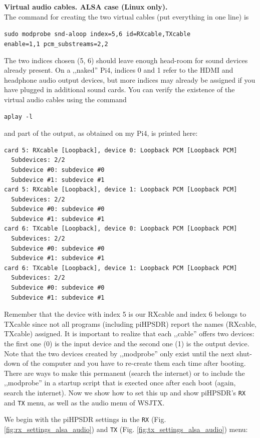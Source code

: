 \documentclass[12pt]{book}
\def\bltt#1{\texttt{\color{blue}#1}}
\begin{document}
\textbf{\color{red}Virtual audio cables. ALSA case (Linux only).} \\
The command for creating the two virtual cables (put everything in one line) is

\texttt{sudo modprobe snd-aloop index=5,6 id=RXcable,TXcable\\
enable=1,1 pcm\_substreams=2,2}

The two indices chosen (5, 6) should leave enough head-room for sound devices
already present. On a ,,naked'' Pi4, indices 0 and 1 refer to the HDMI
and headphone audio output devices, but more indices may already be assigned
if you have plugged in additional sound cards. You can verify the existence of
the virtual audio cables using the command

\texttt{aplay -l}

and part of the output, as obtained on my Pi4, is printed here:

\begin{small}
\begin{verbatim}
card 5: RXcable [Loopback], device 0: Loopback PCM [Loopback PCM]
  Subdevices: 2/2
  Subdevice #0: subdevice #0
  Subdevice #1: subdevice #1
card 5: RXcable [Loopback], device 1: Loopback PCM [Loopback PCM]
  Subdevices: 2/2
  Subdevice #0: subdevice #0
  Subdevice #1: subdevice #1
card 6: TXcable [Loopback], device 0: Loopback PCM [Loopback PCM]
  Subdevices: 2/2
  Subdevice #0: subdevice #0
  Subdevice #1: subdevice #1
card 6: TXcable [Loopback], device 1: Loopback PCM [Loopback PCM]
  Subdevices: 2/2
  Subdevice #0: subdevice #0
  Subdevice #1: subdevice #1
\end{verbatim}
\end{small}
Remember that the device with index 5 is our RXcable and index 6 belongs to TXcable since
not all programs (including piHPSDR) report the names (RXcable, TXcable) assigned. It is
important to realize that each ,,cable'' offers two devices: the first one (0) is
the input device and the second one (1) is the output device.
Note that
the two devices created by ,,modprobe'' only exist until the next shut-down of the computer and
you have to re-create them each time after booting. There are ways to make this permanent (search
the internet) or to include the ,,modprobe'' in a startup script that is exected once after each
boot (again, search the internet). Now we show how to set this up and show piHPSDR's \bltt{RX} and
\bltt{TX} menu, as well as the audio menu of WSJTX. 

We begin with the piHPSDR settings in the \bltt{RX} (Fig. \ref{fig:rx_settings_alsa_audio}) and
\bltt{TX} (Fig. \ref{fig:tx_settings_alsa_audio}) menu:
\end{document}
